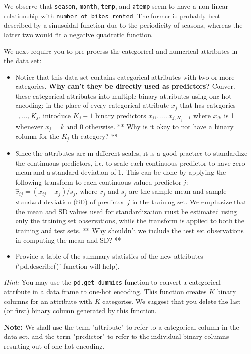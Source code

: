 \documentclass[11pt]{article}
\begin{document}
    We observe that \texttt{season}, \texttt{month}, \texttt{temp}, and
\texttt{atemp} seem to have a non-linear relationship with
\texttt{number\ of\ bikes\ rented}. The former is probably best
described by a sinusoidal function due to the periodicity of seasons,
whereas the latter two would fit a negative quadratic function.

    We next require you to pre-process the categorical and numerical
attributes in the data set:

\begin{itemize}
\item
  Notice that this data set contains categorical attributes with two or
  more categories. \textbf{Why can't they be directly used as
  predictors?} Convert these categorical attributes into multiple binary
  attributes using one-hot encoding: in the place of every categorical
  attribute \(x_j\) that has categories \(1, \ldots, K_j\), introduce
  \(K_j-1\) binary predictors \(x_{j1}, \ldots, x_{j,K_j-1}\) where
  \(x_{jk}\) is 1 whenever \(x_j = k\) and 0 otherwise. ** Why is it
  okay to not have a binary column for the \(K_j\)-th category? **
\item
  Since the attributes are in different scales, it is a good practice to
  standardize the continuous predictors, i.e. to scale each continuous
  predictor to have zero mean and a standard deviation of 1. This can be
  done by applying the following transform to each continuous-valued
  predictor \(j\): \(\hat{x}_{ij} = (x_{ij} - \bar{x}_j) / s_j\), where
  \(\bar{x}_j\) and \(s_j\) are the sample mean and sample standard
  deviation (SD) of predictor \(j\) in the training set. We emphasize
  that the mean and SD values used for standardization must be estimated
  using only the training set observations, while the transform is
  applied to both the training and test sets. ** Why shouldn't we
  include the test set observations in computing the mean and SD? **
\item
  Provide a table of the summary statistics of the new attributes
  (`pd.describe()' function will help).
\end{itemize}

\emph{Hint:} You may use the \texttt{pd.get\_dummies} function to
convert a categorical attribute in a data frame to one-hot encoding.
This function creates \(K\) binary columns for an attribute with \(K\)
categories. We suggest that you delete the last (or first) binary column
generated by this function.

\textbf{Note:} We shall use the term "attribute" to refer to a
categorical column in the data set, and the term "predictor" to refer to
the individual binary columns resulting out of one-hot encoding.
\end{document}
